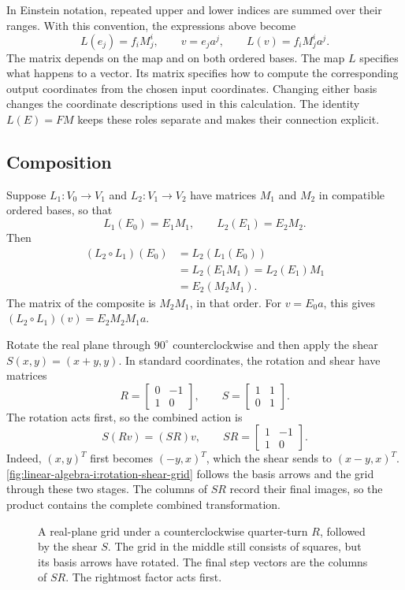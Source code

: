 In Einstein notation, repeated upper and lower indices are summed over their
ranges. With this convention, the expressions above become
\[
  L(e_j)=f_iM^i_j,\qquad v=e_ja^j,\qquad L(v)=f_iM^i_ja^j.
\]
The matrix depends on the map and on both ordered bases.
The map \(L\) specifies what happens to a vector. Its matrix specifies
how to compute the corresponding output coordinates from the chosen input
coordinates. Changing either basis changes the coordinate descriptions
used in this calculation. The identity \(L(E)=FM\) keeps these roles
separate and makes their connection explicit.

\subsection{Composition}

Suppose \(L_1:V_0\to V_1\) and \(L_2:V_1\to V_2\) have matrices
\(M_1\) and \(M_2\) in compatible ordered bases, so that
\[
  L_1(E_0)=E_1M_1,\qquad L_2(E_1)=E_2M_2.
\]
Then
\[
  \begin{aligned}
    (L_2\circ L_1)(E_0)
      &=L_2(L_1(E_0))\\
      &=L_2(E_1M_1)=L_2(E_1)M_1\\
      &=E_2(M_2M_1).
  \end{aligned}
\]
The matrix of the composite is \(M_2M_1\), in that order.
For \(v=E_0a\), this gives \((L_2\circ L_1)(v)=E_2M_2M_1a\).

\begin{example}
  Rotate the real plane through \(90^\circ\) counterclockwise and then
  apply the shear \(S(x,y)=(x+y,y)\). In standard coordinates, the
  rotation and shear have matrices
  \[
    R=\begin{bmatrix}0&-1\\1&0\end{bmatrix},
    \qquad S=\begin{bmatrix}1&1\\0&1\end{bmatrix}.
  \]
  The rotation acts first, so the combined action is
  \[
    S(Rv)=(SR)v,
    \qquad
    SR=\begin{bmatrix}1&-1\\1&0\end{bmatrix}.
  \]
  Indeed, \((x,y)^T\) first becomes \((-y,x)^T\), which the shear
  sends to \((x-y,x)^T\).
  \autoref{fig:linear-algebra-i:rotation-shear-grid} follows the basis
  arrows and the grid through these two stages. The columns of \(SR\)
  record their final images, so the product contains the complete combined
  transformation.
\end{example}
\begin{figure}[htbp]
  \centering
  
  \caption[Rotation followed by shear]{A real-plane grid under a
    counterclockwise quarter-turn \(R\), followed by the shear \(S\).
    The grid in the middle still consists of squares, but its basis
    arrows have rotated. The final step vectors are the columns of
    \(SR\). The rightmost factor acts first.}
  \label{fig:linear-algebra-i:rotation-shear-grid}
\end{figure}

